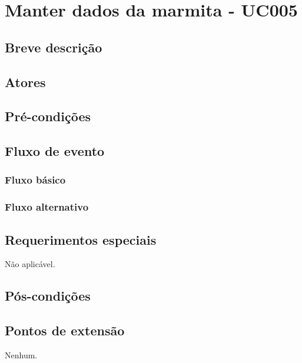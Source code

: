 \chapter{Manter dados da marmita - UC005} \label{uc005}

\section{Breve descrição}

\section{Atores}

\section{Pré-condições}

\section{Fluxo de evento}

\subsection{Fluxo básico}

\subsection{Fluxo alternativo}

\section{Requerimentos especiais}

Não aplicável.

\section{Pós-condições}

\section{Pontos de extensão}

Nenhum.